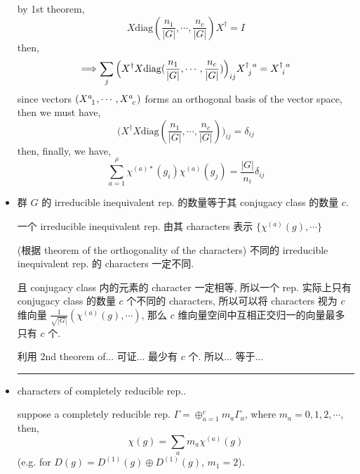 \begin{itemize}
	\begin{tcolorbox}[title=proof:]
		by 1st theorem,
		\begin{equation}
			X \mathrm{diag}(\frac{n_1}{|G|}, \cdots, \frac{n_c}{|G|}) X^\dagger = I
		\end{equation}
		then,
		\begin{equation}
			\Longrightarrow \sum_j \Big( X^\dagger X \mathrm{diag}(\frac{n_1}{|G|}, \cdots, \frac{n_c}{|G|}) \Big)_{i j} \tensor{X}{^\dagger_j^a} = \tensor{X}{^\dagger_i^a}
		\end{equation}
		since vectors $(\tensor{X}{^a_1}, \cdots, \tensor{X}{^a_c})$ forms an orthogonal basis of the vector space, then we must have,
		\begin{equation}
			\Big( X^\dagger X \mathrm{diag}(\frac{n_1}{|G|}, \cdots, \frac{n_c}{|G|}) \Big)_{i j} = \delta_{i j}
		\end{equation}
		then, finally, we have,
		\begin{equation}
			\sum_{a = 1}^\rho \chi^{(a) *}(g_i) \chi^{(a)}(g_j) = \frac{|G|}{n_i} \delta_{i j}
		\end{equation}
	\end{tcolorbox}
	
	\item 群 $G$ 的 irreducible inequivalent rep. 的数量等于其 conjugacy class 的数量 $c$.
	
	\begin{tcolorbox}[title=proof:]
		一个 irreducible inequivalent rep. 由其 characters 表示 $\{\chi^{(a)}(g), \cdots\}$
		
		(根据 theorem of the orthogonality of the characters) 不同的 irreducible inequivalent rep. 的 characters 一定不同.
		
		且 conjugacy class 内的元素的 character 一定相等, 所以一个 rep. 实际上只有 conjugacy class 的数量 $c$ 个不同的 characters, 所以可以将 characters 视为 $c$ 维向量 $\frac{1}{\sqrt{|G|}} (\chi^{(a)}(g), \cdots)$, 那么 $c$ 维向量空间中互相正交归一的向量最多只有 $c$ 个.
		
		利用 2nd theorem of... 可证... 最少有 $c$ 个. 所以... 等于...
	\end{tcolorbox}
	
	\noindent\rule[0.5ex]{\linewidth}{0.5pt} %
	
	\item characters of completely reducible rep..
	
	suppose a completely reducible rep. $\Gamma = \oplus_{a = 1}^c m_a \Gamma_a$, where $m_a = 0, 1, 2, \cdots$, then,
	\begin{equation}
		\chi(g) = \sum_a m_a \chi^{(a)}(g)
	\end{equation}
	(e.g. for $D(g) = D^{(1)}(g) \oplus D^{(1)}(g)$, $m_1 = 2$).
	

\end{itemize}
